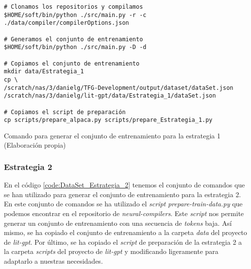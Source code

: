 \begin{mycode}
    \begin{verbatim}
# Clonamos los repositorios y compilamos
$HOME/soft/bin/python ./src/main.py -r -c ./data/compiler/compilerOptions.json

# Generamos el conjunto de entrenamiento
$HOME/soft/bin/python ./src/main.py -D -d

# Copiamos el conjunto de entrenamiento
mkdir data/Estrategia_1
cp \
/scratch/nas/3/danielg/TFG-Development/output/dataset/dataSet.json 
/scratch/nas/3/danielg/lit-gpt/data/Estrategia_1/dataSet.json

# Copiamos el script de preparación
cp scripts/prepare_alpaca.py scripts/prepare_Estrategia_1.py
    \end{verbatim}
    \caption[Comando para generar el conjunto de entrenamiento para la estrategia 1]{Comando para generar el conjunto de entrenamiento para la estrategia 1 (Elaboración propia)}
    \label{code:DataSet_Estrategia_1}
\end{mycode}

\subsubsection{Estrategia 2}
\label{subsubsec:creacion_conjunto:estrategia_2}


En el código \ref{code:DataSet_Estrategia_2} tenemos el conjunto de comandos que se han
utilizado para generar el conjunto de entrenamiento para la estrategia 2. En este conjunto
de comandos se ha utilizado el \textit{script} \textit{prepare-train-data.py} que podemos encontrar
en el repositorio de \textit{neural-compilers}. Este \textit{script} nos permite generar un conjunto
de entrenamiento con una secuencia de \textit{tokens} baja. Así mismo, se ha copiado el conjunto
de entrenamiento a la carpeta \textit{data} del proyecto de \textit{lit-gpt}. Por último,
se ha copiado el \textit{script} de preparación de la estrategia 2 a la carpeta \textit{scripts}
del proyecto de \textit{lit-gpt} y modificando ligeramente para adaptarlo a nuestras necesidades.

